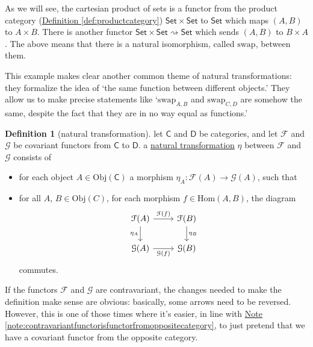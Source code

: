 \documentclass[a4paper]{report}
\newcommand{\defn}[1]{\ul{#1}}
\newcommand{\Obj}{\mathrm{Obj}}
\newcommand{\Hom}{\mathrm{Hom}}
\theoremstyle{definition}
\newtheorem{definition}{Definition}[section]
\theoremstyle{plain}
\theoremstyle{remark}
\begin{document}
As we will see, the cartesian product of sets is a functor from the product category (\hyperref[def:productcategory]{Definition \ref*{def:productcategory}}) $\mathsf{Set} \times \mathsf{Set}$ to $\mathsf{Set}$ which maps $(A, B)$ to $A \times B$. There is another functor $\mathsf{Set} \times \mathsf{Set} \rightsquigarrow \mathsf{Set}$ which sends $(A, B)$ to $B \times A$. The above means that there is a natural isomorphism, called $\mathrm{swap}$, between them.

This example makes clear another common theme of natural transformations: they formalize the idea of `the same function between different objects.' They allow us to make precise statements like `$\mathrm{swap}_{A, B}$ and $\mathrm{swap}_{C, D}$ are somehow the same, despite the fact that they are in no way equal as functions.'

\begin{definition}[natural transformation]
  \label{def:naturaltransformation}
  let $\mathsf{C}$ and $\mathsf{D}$ be categories, and let $\mathcal{F}$ and $\mathcal{G}$ be covariant functors from $\mathsf{C}$ to $\mathsf{D}$. a \defn{natural transformation} $\eta$ between $\mathcal{F}$ and $\mathcal{G}$ consists of 
  \begin{itemize}
    \item for each object $A \in \Obj(\mathsf{C})$ a morphism $\eta_{A}\colon \mathcal{F}(A) \to \mathcal{G}(A)$, such that
    \item for all $A$, $B \in \Obj(C)$, for each morphism $f \in \Hom(A,B)$, the diagram
      \begin{equation*}
        \begin{tikzcd}
          \mathcal{F}(A)\arrow[d, swap, "\eta_{A}"] \arrow[r, "\mathcal{F}(f)"] & \mathcal{F}(B)\arrow[d, "\eta_{B}"] \\
          \mathcal{G}(A) \arrow[r, swap, "\mathcal{G}(f)"] & \mathcal{G}(B) 
        \end{tikzcd}
      \end{equation*}
      commutes.
  \end{itemize}

  If the functors $\mathcal{F}$ and $\mathcal{G}$ are contravariant, the changes needed to make the definition make sense are obvious: basically, some arrows need to be reversed. However, this is one of those times where it's easier, in line with \hyperref[note:contravariantfunctorisfunctorfromoppositecategory]{Note \ref*{note:contravariantfunctorisfunctorfromoppositecategory}}, to just pretend that we have a covariant functor from the opposite category.

\end{definition}
\end{document}
